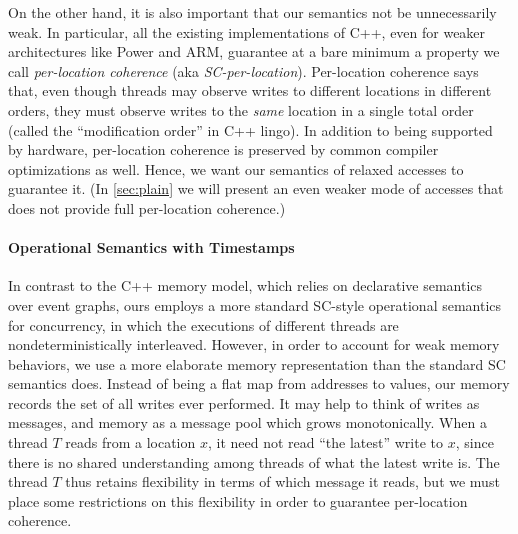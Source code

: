 On the other hand,
it is also important that our semantics not be
unnecessarily weak.  In particular, all the existing 
implementations of C++, even for weaker architectures like Power and
ARM, guarantee at a bare minimum a property we call \emph{per-location
  coherence} (aka \emph{SC-per-location}).  Per-location coherence
says that, even though threads may observe writes to different
locations in different orders, they must observe writes to the
\emph{same} location in a single total order (called the
``modification order'' in C++ lingo).
 In addition to being supported by hardware,
per-location coherence is preserved by common compiler optimizations
as well.  Hence, we want our semantics of relaxed accesses to
guarantee it. (In \cref{sec:plain} we will present an even weaker mode of accesses that
does not provide full per-location coherence.)



\paragraph{Operational Semantics with Timestamps}

In contrast to the C++ memory model, which relies on declarative
semantics over event graphs, ours employs a more standard SC-style
operational semantics for concurrency, in which the executions of
different threads are nondeterministically interleaved.  However, in
order to account for weak memory behaviors, we use a more elaborate
memory representation than the standard SC semantics does.  Instead of
being a flat map from addresses to values, our memory records the set
of all writes ever performed.  It may help to think of writes as
messages, and memory as a message pool which grows monotonically.  When
a thread $T$ reads from a location $x$, it need not read ``the
latest'' write to $x$, since there is no shared understanding among
threads of what the latest write is.  The thread $T$ thus retains
flexibility in terms of which message it reads, but we must place some
restrictions on this flexibility in order to guarantee per-location
coherence.

